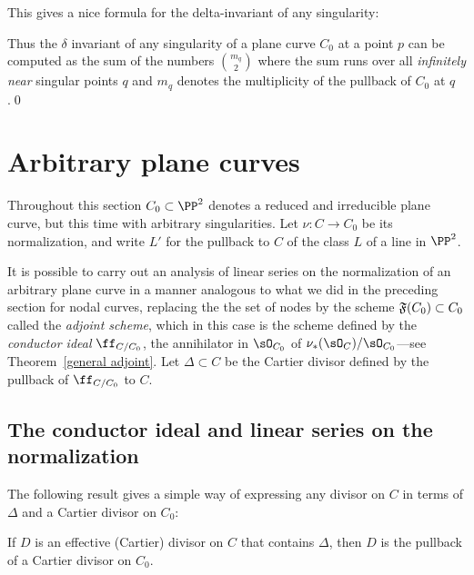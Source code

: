 This gives a nice formula for the delta-invariant of any singularity:

\begin{corollary}
\label{computing delta}

Thus the $\delta$ invariant of any singularity of a plane curve $C_{0}$ at a point $p$ can be computed as the sum of the numbers $\binom{m_{q}}{2}$
where the sum runs over all \emph{infinitely near} singular points $q$ and $m_{q}$
denotes the multiplicity of the pullback of $C_{0}$ at $q$.\qed
\end{corollary}

\section{Arbitrary plane curves} \label{arbitrary plane curves}

Throughout this section $C_0 \subset \PP^2$ denotes a reduced and irreducible plane curve, but  this time with arbitrary singularities. Let $\nu : C \to C_0$ be its normalization, and write $L'$ for the pullback to $C$ of the class $L$ of a line in $\PP^{2}$.

It is possible to carry out an analysis of linear series on the normalization of an arbitrary plane curve in a manner  analogous to what we did in the preceding section for nodal curves, replacing the the set of nodes by the scheme $\adj(C_{0})\subset C_{0}$ called the \emph{adjoint scheme}, which in this case is the scheme
defined by the \emph{conductor ideal} $\ff_{C/C_0}$, the annihilator in $\sO_{C_{0}}$ of $\nu_{*}(\sO_{C})/\sO_{C_{0}}$---see Theorem~\ref{general adjoint}. Let $\Delta\subset C$ be the Cartier divisor
defined by the pullback of $\ff_{C/C_0}$ to $C$.

\subsection{The conductor ideal and linear series on the normalization}

The following result gives a simple way of expressing any divisor on $C$ in terms of $\Delta$ and a
Cartier divisor on $C_{0}$:

\begin{theorem}\label{Cartier on C}
If $D$ is an effective (Cartier) divisor on $C$ that contains $\Delta$, then $D$ is the pullback of a Cartier divisor on $C_{0}$. 
\end{theorem}

